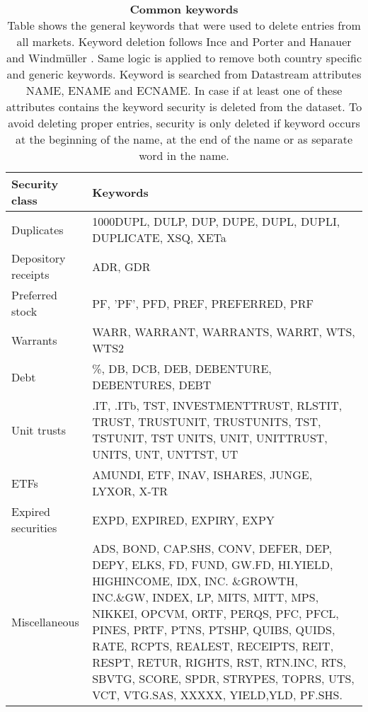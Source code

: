 \documentclass{article}
\begin{document}
\begin{table}[ht] 
\small
\caption[Common keywords]{\textbf{Common keywords}\\ Table shows the general keywords that were used to delete entries from all markets. Keyword deletion follows Ince and Porter \protect\citeyear{Ince2006} and Hanauer and Windmüller \protect\citeyear{HANAUER2023106712}. Same logic is applied to remove both country specific and generic keywords. Keyword is searched from Datastream attributes NAME, ENAME and ECNAME. In case if at least one of these attributes contains the keyword security is deleted from the dataset. To avoid deleting proper entries, security is only deleted if keyword occurs at the beginning of the name, at the end of the name or as separate word in the name.}
 \label{table:GeneralKeywords}
\centering
\begin{tabularx}{\textwidth}{l X}
\toprule
Security class 	& Keywords \\
\midrule
Duplicates 		& 1000DUPL, DULP, DUP, DUPE, DUPL, DUPLI, DUPLICATE, XSQ, XETa  \\[1ex]
Depository receipts	& ADR, GDR \\[1ex]
Preferred stock 	&  PF, ’PF’, PFD, PREF, PREFERRED, PRF\\ [1ex]
Warrants 			&  WARR, WARRANT, WARRANTS, WARRT, WTS, WTS2\\[1ex]
Debt 			& \%, DB, DCB, DEB, DEBENTURE, DEBENTURES, DEBT\\[1ex]
Unit trusts 		& .IT, .ITb, TST, INVESTMENTTRUST, RLSTIT, TRUST, TRUSTUNIT, TRUSTUNITS, TST, TSTUNIT, TST UNITS, UNIT, UNITTRUST, UNITS, UNT, UNTTST, UT\\[1ex]
ETFs 			& AMUNDI, ETF, INAV, ISHARES, JUNGE, LYXOR, X-TR\\[1ex]
Expired securities 	& EXPD, EXPIRED, EXPIRY, EXPY\\[1ex]
Miscellaneous 		& ADS, BOND, CAP.SHS, CONV, DEFER, DEP, DEPY, ELKS, FD, FUND, GW.FD, HI.YIELD, HIGHINCOME, IDX, INC.								\&GROWTH, INC.\&GW, INDEX, LP, MITS, MITT, MPS, NIKKEI, OPCVM, ORTF, PERQS, 												PFC, PFCL, PINES, PRTF, PTNS, PTSHP, QUIBS, QUIDS, RATE, RCPTS, REALEST, RECEIPTS, REIT, RESPT, 								RETUR, RIGHTS, RST, RTN.INC, RTS, SBVTG, SCORE, SPDR, STRYPES, TOPRS, UTS, VCT, VTG.SAS, 									XXXXX, YIELD,YLD, PF.SHS.\\
 \bottomrule
 \end{tabularx}
 \end{table} 

\clearpage
\end{document}
